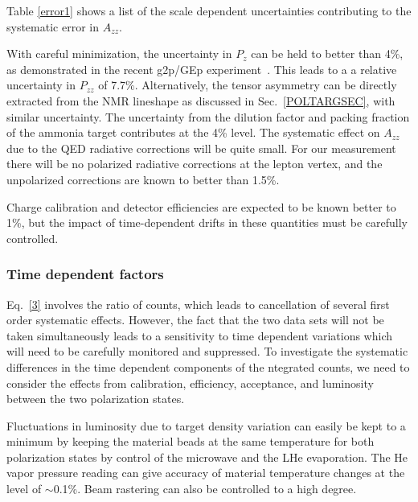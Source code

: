 Table \ref{error1} shows a list of the scale dependent uncertainties contributing to the systematic error in $A_{zz}$.

With careful minimization, the uncertainty in $P_z$ can be held to better than
4\%, as demonstrated in the recent g2p/GEp experiment~\cite{DUSTIN}. 
This leads to a a relative uncertainty in $P_{zz}$ of 7.7\%.  Alternatively, the tensor asymmetry can be directly extracted from the NMR lineshape as discussed in Sec.~\ref{POLTARGSEC}, with similar uncertainty.  The uncertainty from the dilution factor and packing fraction of the ammonia target contributes at the 4\% level.
%
The systematic effect on $A_{zz}$ due to the QED radiative corrections will be quite small.  For our measurement there will be no polarized radiative corrections at the lepton vertex, and the unpolarized corrections are known to better than 1.5\%.


Charge calibration and detector efficiencies are expected to be known better to 1\%, but the impact of time-dependent drifts in these quantities must be carefully controlled.

\subsubsection*{Time dependent factors}
Eq.~\ref{3} involves the ratio of counts, which leads to cancellation of several first order systematic effects.  However, the fact that the two data sets will not be taken simultaneously leads to a sensitivity to time dependent variations which will need to be carefully monitored and suppressed.
%
To investigate the systematic differences in the time dependent components of the ntegrated counts, we need to consider the effects from calibration, efficiency, acceptance, and luminosity between the two polarization states.

Fluctuations in luminosity due to target density variation can easily be kept to a minimum by keeping the material beads at the same temperature for both polarization states by control of the microwave and the LHe evaporation.  The He vapor pressure reading can give accuracy of material temperature changes at the level of $\sim$0.1\%.
Beam rastering can also be controlled to a high degree. 

